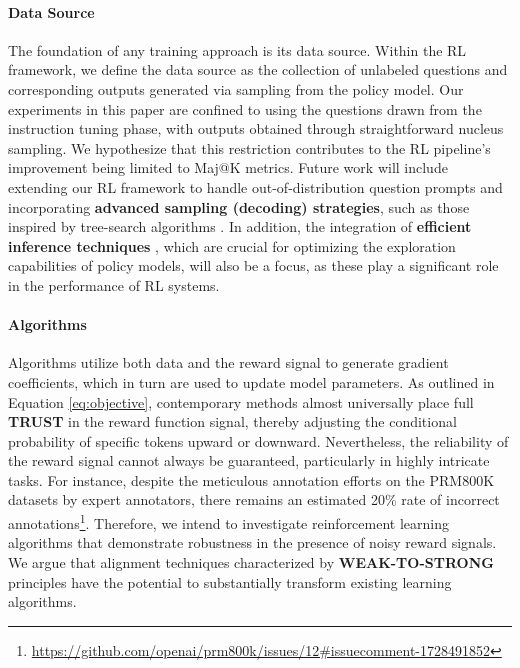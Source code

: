\begin{itemize}[topsep=0pt]
\begin{itemize}[topsep=0pt]
\paragraph{Data Source} The foundation of any training approach is its data source. Within the RL framework, we define the data source as the collection of unlabeled questions and corresponding outputs generated via sampling from the policy model. Our experiments in this paper are confined to using the questions drawn from the instruction tuning phase, with outputs obtained through straightforward nucleus sampling. We hypothesize that this restriction contributes to the RL pipeline's improvement being limited to Maj@K metrics. Future work will include extending our RL framework to handle out-of-distribution question prompts and incorporating \textbf{advanced sampling (decoding) strategies}, such as those inspired by tree-search algorithms \citep{yao2023tree}. In addition, the integration of \textbf{efficient inference techniques} \citep{xia-etal-2023-speculative,leviathan2023fast,kwon2023efficient,xia2024unlocking}, which are crucial for optimizing the exploration capabilities of policy models, will also be a focus, as these play a significant role in the performance of RL systems.

\paragraph{Algorithms} Algorithms utilize both data and the reward signal to generate gradient coefficients, which in turn are used to update model parameters. As outlined in Equation \ref{eq:objective}, contemporary methods almost universally place full \textbf{TRUST} in the reward function signal, thereby adjusting the conditional probability of specific tokens upward or downward. Nevertheless, the reliability of the reward signal cannot always be guaranteed, particularly in highly intricate tasks. For instance, despite the meticulous annotation efforts on the PRM800K datasets \citep{lightman2023let} by expert annotators, there remains an estimated 20\% rate of incorrect annotations\footnote{\url{https://github.com/openai/prm800k/issues/12\#issuecomment-1728491852}}. Therefore, we intend to investigate reinforcement learning algorithms that demonstrate robustness in the presence of noisy reward signals. We argue that alignment techniques characterized by \textbf{WEAK-TO-STRONG} \citep{burns2023weak} principles have the potential to substantially transform existing learning algorithms.


\end{itemize}
\end{itemize}
